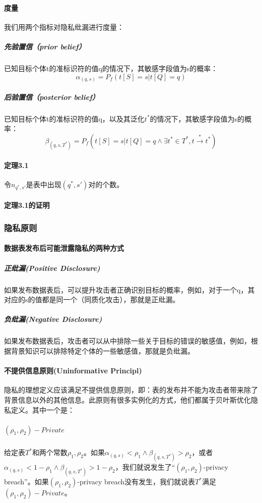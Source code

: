 \documentclass[12pt,a4paper]{article}
\begin{document}
\paragraph{度量} 我们用两个指标对隐私纰漏进行度量：
	\subparagraph{先验置信（prior belief）} 已知目标个体t的准标识符的值q的情况下，其敏感字段值为s的概率：
	\begin{equation}
		\alpha_{(q,s)} = P_f(t[S]=s|t[Q]=q)
	\end{equation}

	\subparagraph{后验置信（posterior belief）} 已知目标个体t的准标识符的值q，以及其泛化$t^*$的情况下，其敏感字段值为s的概率：
	\begin{equation}
		\beta_{(q,s,T^*)}=P_f(t[S]=s|t[Q]=q \wedge \exists t^* \in T^*, t \overset{*}{\rightarrow}t^* )
	\end{equation}
\paragraph{定理3.1} 令$n_{q^*,s'}$是表中出现$(q^*, s')$对的个数。

\paragraph{定理3.1的证明}

\subsubsection{隐私原则}
\paragraph{数据表发布后可能泄露隐私的两种方式}
	\subparagraph{正纰漏(Positive Disclosure)} 如果发布数据表后，可以提升攻击者正确识别目标的概率，例如，对于一个q，其对应的s的值都是同一个（同质化攻击），那就是正纰漏。 
	\subparagraph{负纰漏(Negative Disclosure)} 如果发布数据表后，攻击者可以从中排除一些关于目标的错误的敏感值，例如，根据背景知识可以排除特定个体的一些敏感值，那就是负纰漏。
\paragraph{不提供信息原则(Uninformative Principl)} 隐私的理想定义应该满足不提供信息原则，即：表的发布并不能为攻击者带来除了背景信息以外的其他信息。此原则有很多实例化的方式，他们都属于贝叶斯优化隐私定义。其中一个是：
	\subparagraph{$(\rho_1, \rho_2)-Private$} 给定表$T^*$和两个常数$\rho_1,\rho_2$。如果$\alpha_{(q,s)} < \rho_1 \wedge \beta_{(q,s,T^*)} > \rho_2$，或者$\alpha_{(q,s)} < 1 - \rho_1 \wedge \beta_{(q,s,T^*)} > 1 - \rho_2$，我们就说发生了“$(\rho_1, \rho_2)$-privacy breach”。如果$(\rho_1, \rho_2)$-privacy breach没有发生，我们就说表$T^*$满足$(\rho_1, \rho_2)-Private$。
\end{document}
